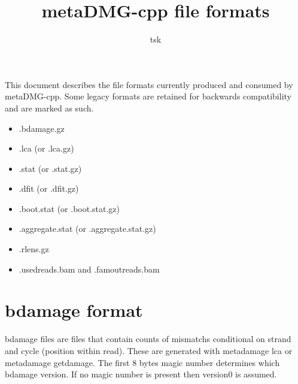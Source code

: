 \documentclass[10pt]{article}
\begin{document}
\title{metaDMG-cpp file formats}
\author{tsk}
\maketitle
\vspace*{1em}

This document describes the file formats currently produced and consumed by
metaDMG-cpp. Some legacy formats are retained for backwards compatibility and
are marked as such.
\begin{itemize}
\item .bdamage.gz
\item .lca (or .lca.gz)
\item .stat (or .stat.gz)
\item .dfit (or .dfit.gz)
\item .boot.stat (or .boot.stat.gz)
\item .aggregate.stat (or .aggregate.stat.gz)
\item .rlens.gz
\item .usedreads.bam and .famoutreads.bam
\end{itemize}

\section{bdamage format}
bdamage files are files that contain counts of mismatchs conditional on strand and cycle (position within read). These are generated with metadamage lca or metadamage getdamage. 
The first 8 bytes magic number determines which bdamage version. If no magic number is present then version0 is assumed. 
\end{document}
